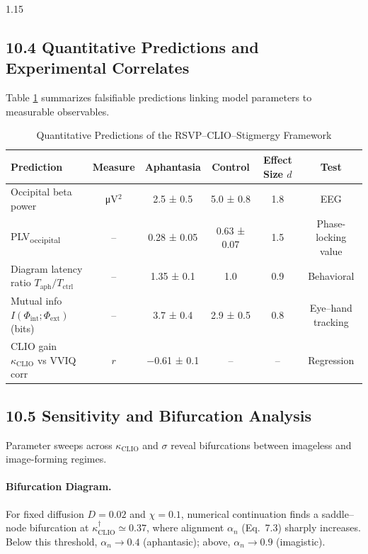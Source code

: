 \documentclass[12pt,a4paper]{article}
\begin{document}
\begin{spacing}{1.15}
\subsection{10.4 Quantitative Predictions and Experimental Correlates}

Table \ref{tab:predictions} summarizes falsifiable predictions linking model parameters to measurable observables.

\begin{table}[h!]
\centering
\caption{Quantitative Predictions of the RSVP–CLIO–Stigmergy Framework}
\label{tab:predictions}
\begin{tabular}{@{}lccccc@{}}
\toprule
\textbf{Prediction} & \textbf{Measure} & \textbf{Aphantasia} & \textbf{Control} & \textbf{Effect Size $d$} & \textbf{Test}\\
\midrule
Occipital beta power & μV$^2$ & 2.5 ± 0.5 & 5.0 ± 0.8 & 1.8 & EEG\\
PLV\textsubscript{occipital} & – & 0.28 ± 0.05 & 0.63 ± 0.07 & 1.5 & Phase-locking value\\
Diagram latency ratio $T_{\mathrm{aph}}/T_{\mathrm{ctrl}}$ & – & 1.35 ± 0.1 & 1.0 & 0.9 & Behavioral\\
Mutual info $I(\Phi_{\mathrm{int}};\Phi_{\mathrm{ext}})$ (bits) & – & 3.7 ± 0.4 & 2.9 ± 0.5 & 0.8 & Eye–hand tracking\\
CLIO gain $\kappa_{\mathrm{CLIO}}$ vs VVIQ corr & $r$ & −0.61 ± 0.1 & – & – & Regression\\
\bottomrule
\end{tabular}
\end{table}

\subsection{10.5 Sensitivity and Bifurcation Analysis}

Parameter sweeps across $\kappa_{\mathrm{CLIO}}$ and $\sigma$
reveal bifurcations between imageless and image-forming regimes.

\paragraph{Bifurcation Diagram.}
For fixed diffusion $D=0.02$ and $\chi=0.1$,
numerical continuation finds a saddle–node bifurcation at
$\kappa_{\mathrm{CLIO}}^\dagger\simeq0.37$,
where alignment $\alpha_n$ (Eq.\ 7.3) sharply increases.
Below this threshold, $\alpha_n\!\to\!0.4$ (aphantasic); above, $\alpha_n\!\to\!0.9$ (imagistic).


\end{spacing}
\end{document}
